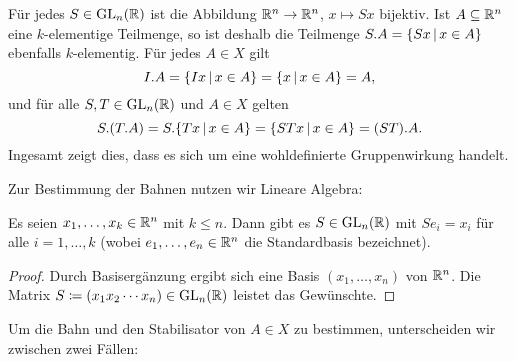 \section{}





\addtocounter{subsection}{1}





\addtocounter{subsection}{1}





\addtocounter{subsection}{1}





\subsection{}

Für jedes $S \in \operatorname{GL}_{n}(\mathbb{R})$ ist die Abbildung $\mathbb{R}^n \to \mathbb{R}^n$, $x \mapsto Sx$ bijektiv.
Ist $A \subseteq \mathbb{R}^n$ eine $k$-elementige Teilmenge, so ist deshalb die Teilmenge $S.A = \{ Sx \suchthat x \in A\}$ ebenfalls $k$-elementig.
Für jedes $A \in X$ gilt
\[
    I.A
  = \{ Ix \suchthat x \in A \}
  = \{ x \suchthat x \in A \}
  = A,
\]
und für alle $S, T \in \operatorname{GL}_{n}(\mathbb{R})$ und $A \in X$ gelten
\[
    S.(T.A)
  = S.\{ Tx \suchthat x \in A \}
  = \{ STx \suchthat x \in A \}
  = (ST).A.
\]
Ingesamt zeigt dies, dass es sich um eine wohldefinierte Gruppenwirkung handelt.

Zur Bestimmung der Bahnen nutzen wir Lineare Algebra:

\begin{lemma}
  \label{lemma: transitive on linear independent}
  Es seien $x_1, \dotsc, x_k \in \mathbb{R}^n$ mit $k \leq n$.
  Dann gibt es $S \in \operatorname{GL}_{n}(\mathbb{R})$ mit $Se_i = x_i$ für alle $i = 1, \dotsc, k$ \textup(wobei $e_1, \dotsc, e_n \in \mathbb{R}^n$ die Standardbasis bezeichnet\textup).
\end{lemma}

\begin{proof}
  Durch Basisergänzung ergibt sich eine Basis $(x_1, \dotsc, x_n)$ von $\mathbb{R}^n$.
  Die Matrix $S \coloneqq (x_1 x_2 \dotsb x_n) \in \operatorname{GL}_{n}(\mathbb{R})$ leistet das Gewünschte.
\end{proof}

Um die Bahn und den Stabilisator von $A \in X$ zu bestimmen, unterscheiden wir zwischen zwei Fällen:

